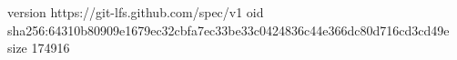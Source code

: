 version https://git-lfs.github.com/spec/v1
oid sha256:64310b80909e1679ec32cbfa7ec33be33c0424836c44e366dc80d716cd3cd49e
size 174916
